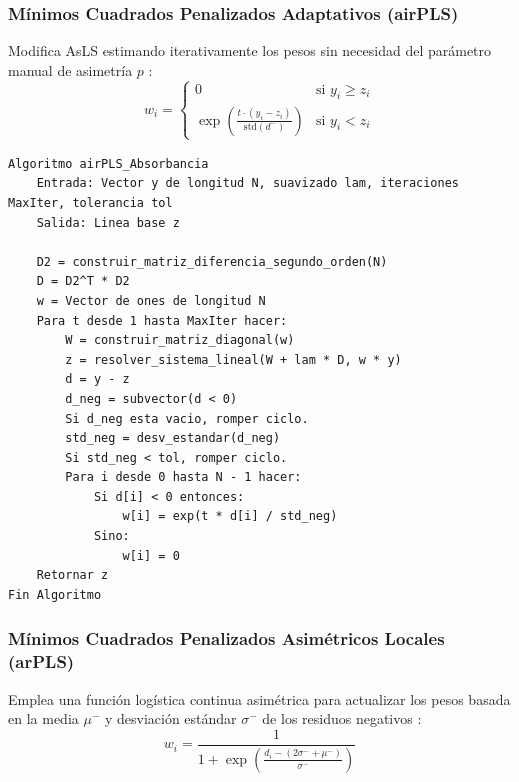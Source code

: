 \subsubsection{Mínimos Cuadrados Penalizados Adaptativos (airPLS)}
Modifica AsLS estimando iterativamente los pesos sin necesidad del parámetro manual de asimetría $p$ \cite{zhang2010}:
\begin{equation}
    w_i = \begin{cases} 0 & \text{si } y_i \ge z_i \\ \exp\left( \frac{t \cdot (y_i - z_i)}{\text{std}(d^-)} \right) & \text{si } y_i < z_i \end{cases}
\end{equation}

\begin{lstlisting}[caption=Algoritmo airPLS (Absorbancia)]
Algoritmo airPLS_Absorbancia
    Entrada: Vector y de longitud N, suavizado lam, iteraciones MaxIter, tolerancia tol
    Salida: Linea base z

    D2 = construir_matriz_diferencia_segundo_orden(N)
    D = D2^T * D2
    w = Vector de ones de longitud N
    Para t desde 1 hasta MaxIter hacer:
        W = construir_matriz_diagonal(w)
        z = resolver_sistema_lineal(W + lam * D, w * y)
        d = y - z
        d_neg = subvector(d < 0)
        Si d_neg esta vacio, romper ciclo.
        std_neg = desv_estandar(d_neg)
        Si std_neg < tol, romper ciclo.
        Para i desde 0 hasta N - 1 hacer:
            Si d[i] < 0 entonces:
                w[i] = exp(t * d[i] / std_neg)
            Sino:
                w[i] = 0
    Retornar z
Fin Algoritmo
\end{lstlisting}

\subsubsection{Mínimos Cuadrados Penalizados Asimétricos Locales (arPLS)}
Emplea una función logística continua asimétrica para actualizar los pesos basada en la media $\mu^-$ y desviación estándar $\sigma^-$ de los residuos negativos \cite{baek2015}:
\begin{equation}
    w_i = \frac{1}{1 + \exp\left( \frac{d_i - (2 \sigma^- + \mu^-)}{\sigma^-} \right)}
\end{equation}

